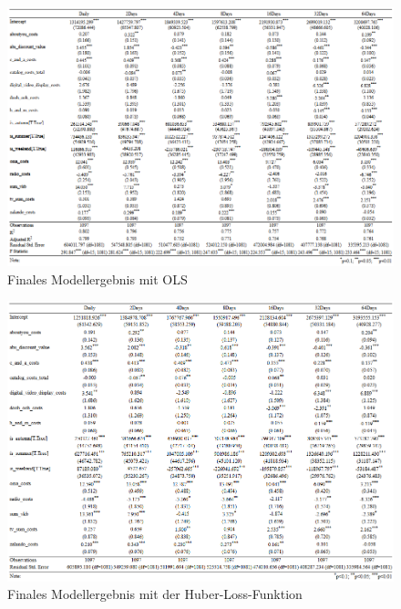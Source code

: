 \begin{figure}[H]
    \centering
    \includegraphics[width=1\linewidth]{images/finalols.png}
    \caption{Finales Modellergebnis mit \ac{OLS}}
    \label{fig:finalmodell}
\end{figure}

\begin{figure}
    \centering
    \includegraphics[width=1\linewidth]{images/finalhuber.png}
    \caption{Finales Modellergebnis mit der Huber-Loss-Funktion}
    \label{fig:finalhuber}
\end{figure}